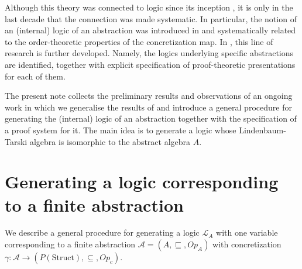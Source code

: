 \documentclass[11pt]{article}
\theoremstyle{plain}
\theoremstyle{definition}
\begin{document}
Although this theory was connected to logic since its inception \cite{cousot1,cousot2,jensen}, it is only in the last decade that the connection was made systematic. In particular, the notion of an (internal) logic of an abstraction was introduced in  \cite{schmidt2008internal}  and systematically related to the order-theoretic properties of the concretization map. In \cite{DSilva2017}, this line of research is further developed. Namely, the logics underlying  specific abstractions are identified, together with explicit specification of  proof-theoretic presentations for each of them.

The present note collects the preliminary results and observations of an ongoing work in which  we generalise the results of \cite{DSilva2017} and introduce a general procedure for generating the (internal) logic of an abstraction together with the specification of a proof system for it. The main idea  is to  generate a logic whose Lindenbaum-Tarski algebra is isomorphic to the  abstract algebra $A$.  %

 

\section{Generating a logic corresponding to a finite abstraction}

We describe a general procedure for generating a logic $\mathcal{L}_A$ with one variable corresponding to a finite abstraction $\mathcal{A}=(A,\sqsubseteq, Op_A)$ with concretization $\gamma:\mathcal{A}\to (P(\text{Struct}),\subseteq, Op_c)$.  
\end{document}
